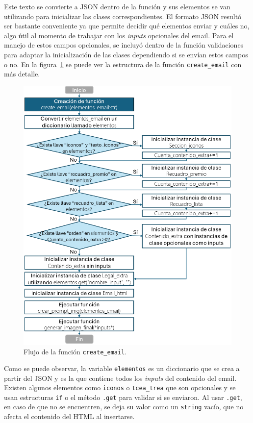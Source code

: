 Este texto se convierte a JSON dentro de la función y sus elementos se van utilizando para inicializar las clases correspondientes. El formato JSON resultó ser bastante conveniente ya que permite decidir qué elementos enviar y cuáles no, algo útil al momento de trabajar con los \textit{inputs} opcionales del email. Para el manejo de estos campos opcionales, se incluyó dentro de la función validaciones para adaptar la inicialización de las clases dependiendo si se envían estos campos o no. En la figura~\ref{fig:createEmail} se puede ver la estructura de la función \texttt{create\_email} con más detalle.

\begin{figure}[!htpb]
    \centering
    \includegraphics[width=1\linewidth]{Figures/Flujo_create_email.png}
    \caption{Flujo de la función \texttt{create\_email}.}
    \label{fig:createEmail}
\end{figure}

Como se puede observar, la variable \texttt{elementos} es un diccionario que se crea a partir del JSON y es la que contiene todos los \textit{inputs} del contenido del email. Existen algunos elementos como \texttt{iconos} o \texttt{tcea\_trea} que son opcionales y se usan estructuras \texttt{if} o el método \texttt{.get} para validar si se enviaron. Al usar \texttt{.get}, en caso de que no se encuentren, se deja su valor como un \texttt{string} vacío, que no afecta el contenido del HTML al insertarse.

